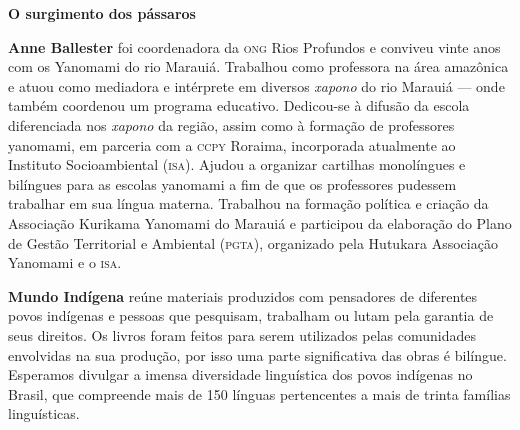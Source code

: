 \textbf{O surgimento dos pássaros} 

\textbf{Anne Ballester} foi coordenadora da \textsc{ong} Rios Profundos e conviveu vinte anos com os Yanomami do rio Marauiá. Trabalhou como professora na área amazônica e atuou como mediadora e intérprete em diversos \textit{xapono} do rio Marauiá --- onde também coordenou um programa educativo. Dedicou-se à difusão da escola diferenciada nos \textit{xapono} da região, assim como à formação de professores yanomami, em parceria com a \textsc{ccpy} Roraima, incorporada atualmente ao Instituto Socioambiental (\textsc{isa}). Ajudou a organizar cartilhas monolíngues e bilíngues para as escolas yanomami a fim de que os professores pudessem trabalhar em sua língua materna. Trabalhou na formação política e criação da Associação Kurikama Yanomami do Marauiá e participou da elaboração do Plano de Gestão Territorial e Ambiental (\textsc{pgta}), organizado pela Hutukara Associação Yanomami e o \textsc{isa}.

\textbf{Mundo Indígena} reúne materiais produzidos com pensadores de diferentes povos indígenas e pessoas que pesquisam, trabalham ou lutam pela garantia de seus direitos. Os livros foram feitos para serem utilizados pelas comunidades envolvidas na sua produção, por isso uma parte significativa das obras é bilíngue. Esperamos divulgar a imensa diversidade linguística dos povos indígenas no Brasil, que compreende mais de 150 línguas pertencentes a mais de trinta famílias linguísticas.



